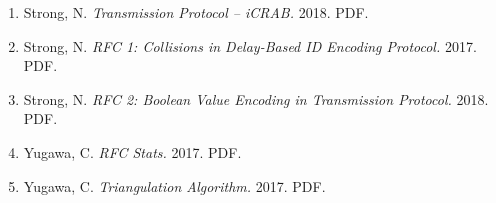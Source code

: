 \documentclass[12pt]{article}
\begin{document}
\begin{enumerate}
\item \label{ref-icrab-proto}
        Strong, N.
        {\em Transmission Protocol -- iCRAB.}
        2018. PDF.
\item \label{ref-rfc1}
        Strong, N.
        {\em RFC 1: Collisions in Delay-Based ID Encoding Protocol.}
        2017. PDF.
\item \label{ref-rfc2}
        Strong, N.
        {\em RFC 2: Boolean Value Encoding in Transmission Protocol.}
        2018. PDF.
\item \label{ref-rfc-stats}
        Yugawa, C.
        {\em RFC Stats.}
        2017. PDF.
\item \label{ref-dir-alg}
        Yugawa, C.
        {\em Triangulation Algorithm.}
        2017. PDF.
\end{enumerate}


\printglossary
\end{document}
